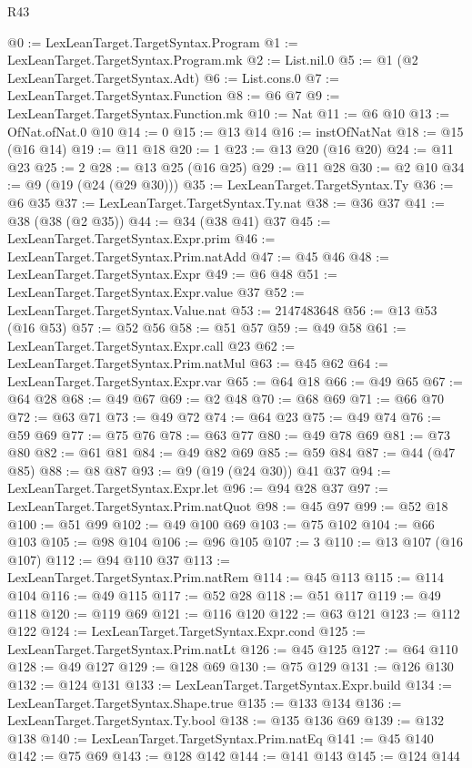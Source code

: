 \begin{lexlean}{R43}
\begin{coremodule}
@0 := LexLeanTarget.TargetSyntax.Program
@1 := LexLeanTarget.TargetSyntax.Program.mk
@2 := List.nil.{0}
@5 := @1 (@2 LexLeanTarget.TargetSyntax.Adt)
@6 := List.cons.{0}
@7 := LexLeanTarget.TargetSyntax.Function
@8 := @6 @7
@9 := LexLeanTarget.TargetSyntax.Function.mk
@10 := Nat
@11 := @6 @10
@13 := OfNat.ofNat.{0} @10
@14 := 0
@15 := @13 @14
@16 := instOfNatNat
@18 := @15 (@16 @14)
@19 := @11 @18
@20 := 1
@23 := @13 @20 (@16 @20)
@24 := @11 @23
@25 := 2
@28 := @13 @25 (@16 @25)
@29 := @11 @28
@30 := @2 @10
@34 := @9 (@19 (@24 (@29 @30)))
@35 := LexLeanTarget.TargetSyntax.Ty
@36 := @6 @35
@37 := LexLeanTarget.TargetSyntax.Ty.nat
@38 := @36 @37
@41 := @38 (@38 (@2 @35))
@44 := @34 (@38 @41) @37
@45 := LexLeanTarget.TargetSyntax.Expr.prim
@46 := LexLeanTarget.TargetSyntax.Prim.natAdd
@47 := @45 @46
@48 := LexLeanTarget.TargetSyntax.Expr
@49 := @6 @48
@51 := LexLeanTarget.TargetSyntax.Expr.value @37
@52 := LexLeanTarget.TargetSyntax.Value.nat
@53 := 2147483648
@56 := @13 @53 (@16 @53)
@57 := @52 @56
@58 := @51 @57
@59 := @49 @58
@61 := LexLeanTarget.TargetSyntax.Expr.call @23
@62 := LexLeanTarget.TargetSyntax.Prim.natMul
@63 := @45 @62
@64 := LexLeanTarget.TargetSyntax.Expr.var
@65 := @64 @18
@66 := @49 @65
@67 := @64 @28
@68 := @49 @67
@69 := @2 @48
@70 := @68 @69
@71 := @66 @70
@72 := @63 @71
@73 := @49 @72
@74 := @64 @23
@75 := @49 @74
@76 := @59 @69
@77 := @75 @76
@78 := @63 @77
@80 := @49 @78 @69
@81 := @73 @80
@82 := @61 @81
@84 := @49 @82 @69
@85 := @59 @84
@87 := @44 (@47 @85)
@88 := @8 @87
@93 := @9 (@19 (@24 @30)) @41 @37
@94 := LexLeanTarget.TargetSyntax.Expr.let
@96 := @94 @28 @37
@97 := LexLeanTarget.TargetSyntax.Prim.natQuot
@98 := @45 @97
@99 := @52 @18
@100 := @51 @99
@102 := @49 @100 @69
@103 := @75 @102
@104 := @66 @103
@105 := @98 @104
@106 := @96 @105
@107 := 3
@110 := @13 @107 (@16 @107)
@112 := @94 @110 @37
@113 := LexLeanTarget.TargetSyntax.Prim.natRem
@114 := @45 @113
@115 := @114 @104
@116 := @49 @115
@117 := @52 @28
@118 := @51 @117
@119 := @49 @118
@120 := @119 @69
@121 := @116 @120
@122 := @63 @121
@123 := @112 @122
@124 := LexLeanTarget.TargetSyntax.Expr.cond
@125 := LexLeanTarget.TargetSyntax.Prim.natLt
@126 := @45 @125
@127 := @64 @110
@128 := @49 @127
@129 := @128 @69
@130 := @75 @129
@131 := @126 @130
@132 := @124 @131
@133 := LexLeanTarget.TargetSyntax.Expr.build
@134 := LexLeanTarget.TargetSyntax.Shape.true
@135 := @133 @134
@136 := LexLeanTarget.TargetSyntax.Ty.bool
@138 := @135 @136 @69
@139 := @132 @138
@140 := LexLeanTarget.TargetSyntax.Prim.natEq
@141 := @45 @140
@142 := @75 @69
@143 := @128 @142
@144 := @141 @143
@145 := @124 @144

\end{coremodule}
\end{lexlean}
